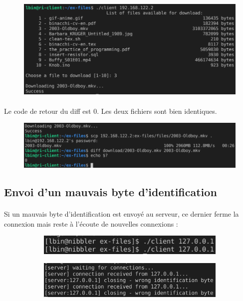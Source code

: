 \documentclass{article}
\begin{document}
    \begin{figure}[H]
        \centering
        \includegraphics[width=.7\textwidth]{./screenshots/test-big-file-client.png}
    \end{figure}

    \newpage
    \paragraph{}
    Le code de retour du diff est 0. Les deux fichiers sont bien identiques.
    \begin{figure}[H]
        \centering
        \includegraphics[width=.8\textwidth]{./screenshots/test-big-file.png}
    \end{figure}

    \subsection{Envoi d'un mauvais byte d'identification}
    \paragraph{}
    Si un mauvais byte d'identification est envoyé au serveur, ce dernier ferme la connexion mais reste à l'écoute de nouvelles connexions :
    \begin{figure}[H]
        \centering
        \begin{subfigure}[b]{.48\textwidth}
            \centering
            \includegraphics[width=.8\textwidth]{./screenshots/test-wrong-id-client.png}
        \end{subfigure}
        \begin{subfigure}[b]{.48\textwidth}
            \centering
            \includegraphics[width=\textwidth]{./screenshots/test-wrong-id-server.png}
        \end{subfigure}
    \end{figure}
\end{document}

